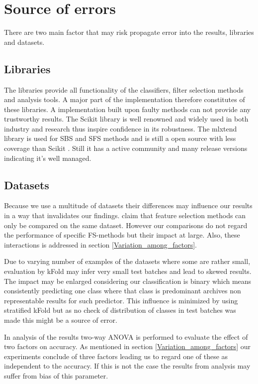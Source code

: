 

\section{Source of errors}
\label{sec:source_of_errors}

There are two main factor that may risk propagate error into the results, libraries and datasets.

\subsection{Libraries}

The libraries provide all functionality of the classifiers, filter selection methods and analysis tools. A major part of the implementation therefore constitutes of these libraries. A implementation built upon faulty methods can not provide any trustworthy results. The Scikit library \parencite{scikit-learn} is well renowned and widely used in both industry and research thus inspire confidence in its robustness. The mlxtend library is used for SBS and SFS methods and is still a open source with less coverage than Scikit \parencite{mlextend}. Still it has a active community and many release versions indicating it's well managed.

\subsection{Datasets}

Because we use a multitude of datasets their differences may influence our results in a way that invalidates our findings. \textcite{c201416} claim that feature selection methods can only be compared on the same dataset. However our comparisons do not regard the performance of specific FS-methods but their impact at large. Also, these interactions is addressed in section \ref{Variation_among_factors}.

Due to varying number of examples of the datasets where some are rather small, evaluation by kFold may infer very small test batches and lead to skewed results. The impact may be enlarged considering our classification is binary which means consistently predicting one class where that class is predominant archives non representable results for such predictor. This influence is minimized by using stratified kFold but as no check of distribution of classes in test batches was made this might be a source of error.

In analysis of the results two-way ANOVA is performed to evaluate the effect of two factors on accuracy. As mentioned in section \ref{Variation_among_factors} our experiments conclude of three factors leading us to regard one of these as independent to the accuracy. If this is not the case the results from analysis may suffer from bias of this parameter.
